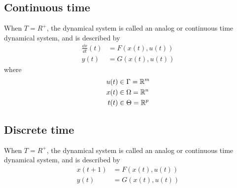 \subsection{Continuous time}

When $T = R^+$, the dynamical system is called an analog or continuous time dynamical system, and is described by
\[
    \begin{aligned}
        \frac{\dd x}{\dd t}(t) &= F(x(t), u(t))\\
        y(t) &= G(x(t), u(t))
    \end{aligned}
\]
where
\[
    \begin{aligned}
        u(t) &\in \Gamma = \mathbb{R}^m\\
        x(t) &\in \Omega = \mathbb{R}^n\\
        t(t) &\in \Theta = \mathbb{R}^p
    \end{aligned}
\]

\subsection{Discrete time}

When $T = R^+$, the dynamical system is called an analog or continuous time dynamical system, and is described by
\[
    \begin{aligned}
        x(t+1) &= F(x(t), u(t))\\
        y(t) &= G(x(t), u(t))
    \end{aligned}
\]